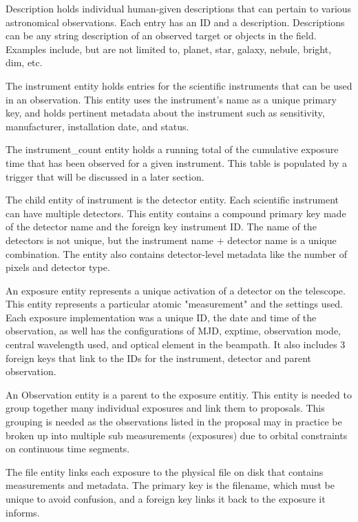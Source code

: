 \documentclass[a4paper,11pt]{article}
\begin{document}
Description holds individual human-given descriptions that can pertain to various astronomical observations.  Each entry has an ID and a description.  Descriptions can be any string description of an observed target or objects in the field.  Examples include, but are not limited to, planet, star, galaxy, nebule, bright, dim, etc.

The instrument entity holds entries for the scientific instruments that can be used in an observation.  This entity uses the instrument's name as a unique primary key, and holds pertinent metadata about the instrument such as sensitivity, manufacturer, installation date, and status.  

The instrument\_count entity holds a running total of the cumulative exposure time that has been observed for a given instrument.  This table is populated by a trigger that will be discussed in a later section.

The child entity of instrument is the detector entity.  Each scientific instrument can have multiple detectors.  This entity contains a compound primary key made of the detector name and the foreign key instrument ID.  The name of the detectors is not unique, but the instrument name + detector name is a unique combination.  The entity also contains detector-level metadata like the number of pixels and detector type.  

An exposure entity represents a unique activation of a detector on the telescope.  This entity represents a particular atomic "measurement" and the settings used.  Each exposure implementation was a unique ID, the date and time of the observation, as well has the configurations of MJD, exptime, observation mode, central wavelength used, and optical element in the beampath.  It also includes 3 foreign keys that link to the IDs for the instrument, detector and parent observation.

An Observation entity is a parent to the exposure entitiy. This entity is needed to group together many individual exposures and link them to proposals.  This grouping is needed as the observations listed in the proposal may in practice be broken up into multiple sub measurements (exposures) due to orbital constraints on continuous time segments.  

The file entity links each exposure to the physical file on disk that contains measurements and metadata. The primary key is the filename, which must be unique to avoid confusion, and a foreign key links it back to the exposure it informs.
\end{document}
